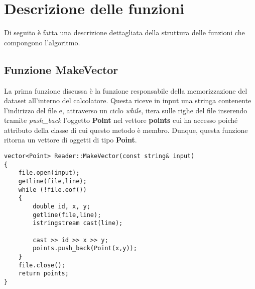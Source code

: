 \documentclass{article}
\begin{document}
\section{Descrizione delle funzioni}
Di seguito è fatta una descrizione dettagliata della struttura delle funzioni che compongono l'algoritmo.

\subsection{Funzione MakeVector}\label{sez 4.1}
La prima funzione discussa è la funzione responsabile della memorizzazione del dataset all'interno del calcolatore.  Questa riceve in input una stringa contenente l'indirizzo del file e,  attraverso un ciclo \emph{while},  itera sulle righe del file inserendo tramite \emph{push\_back} l'oggetto \textbf{Point} nel vettore \textbf{points} cui ha accesso poiché attributo della classe di cui questo metodo è membro.
Dunque,  questa funzione ritorna un vettore di oggetti di tipo \textbf{Point}.

\begin{lstlisting}
vector<Point> Reader::MakeVector(const string& input)
{
    file.open(input);
    getline(file,line);
    while (!file.eof())
    {
        double id, x, y;
        getline(file,line);
        istringstream cast(line);

        cast >> id >> x >> y;
        points.push_back(Point(x,y));
    }
    file.close();
    return points;
}
\end{lstlisting}
\end{document}
